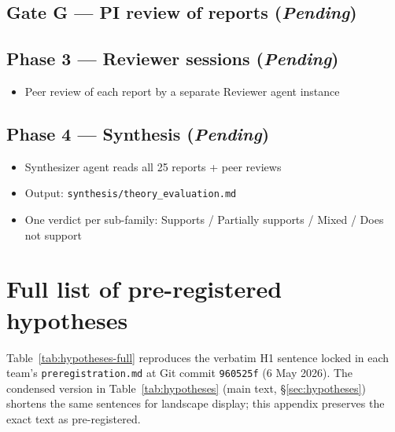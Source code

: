 \documentclass[12pt,a4paper]{article}
\begin{document}
\subsection*{Gate G --- PI review of reports (\emph{Pending})}

\subsection*{Phase 3 --- Reviewer sessions (\emph{Pending})}

\begin{itemize}
  \item Peer review of each report by a separate Reviewer agent instance
\end{itemize}

\subsection*{Phase 4 --- Synthesis (\emph{Pending})}

\begin{itemize}
  \item Synthesizer agent reads all 25 reports + peer reviews
  \item Output: \texttt{synthesis/theory\_evaluation.md}
  \item One verdict per sub-family: Supports / Partially supports / Mixed / Does not support
\end{itemize}

\section{Full list of pre-registered hypotheses}
\label{app:hypotheses-full}

Table~\ref{tab:hypotheses-full} reproduces the verbatim H1 sentence
locked in each team's \texttt{preregistration.md} at Git commit
\texttt{960525f} (6 May 2026). The condensed version in
Table~\ref{tab:hypotheses} (main text, \S\ref{sec:hypotheses}) shortens
the same sentences for landscape display; this appendix preserves the
exact text as pre-registered.
\end{document}
